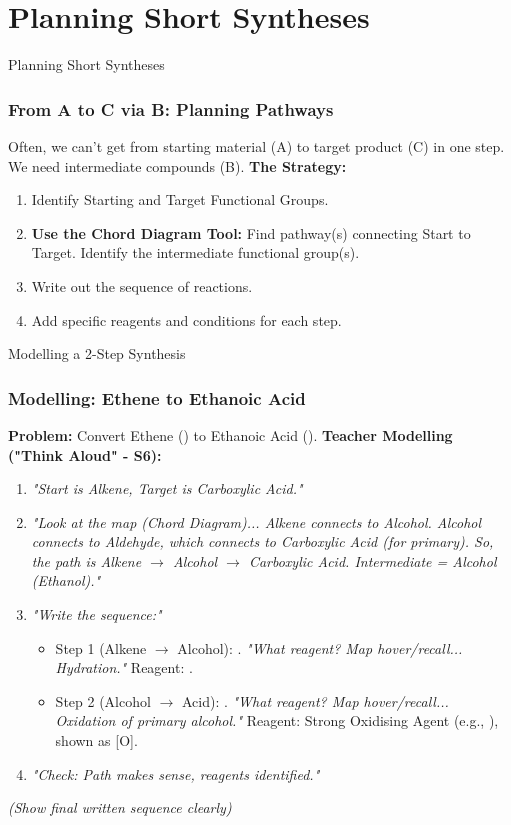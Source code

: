 \documentclass[xcolor=svgnames]{beamer}
\begin{document}
\section{Planning Short Syntheses}
\begin{frame}{Planning Short Syntheses}
    \frametitle{From A to C via B: Planning Pathways}
    Often, we can't get from starting material (A) to target product (C) in one step. We need intermediate compounds (B).
    \vspace{1em}
    \textbf{The Strategy:}
    \begin{enumerate}
        \item Identify Starting and Target Functional Groups.
        \item \textbf{Use the Chord Diagram Tool:} Find pathway(s) connecting Start to Target. Identify the intermediate functional group(s).
        \item Write out the sequence of reactions.
        \item Add specific reagents and conditions for each step.
    \end{enumerate}
\end{frame}

\begin{frame}{Modelling a 2-Step Synthesis}
    \frametitle{Modelling: Ethene to Ethanoic Acid}
    \textbf{Problem:} Convert Ethene () to Ethanoic Acid ().
    \vspace{1em}
    \textbf{Teacher Modelling ("Think Aloud" - S6):}
    \begin{enumerate}
        \item \textit{"Start is Alkene, Target is Carboxylic Acid."}
        \item \textit{"Look at the map (Chord Diagram)... Alkene connects to Alcohol. Alcohol connects to Aldehyde, which connects to Carboxylic Acid (for primary). So, the path is Alkene $\rightarrow$ Alcohol $\rightarrow$ Carboxylic Acid. Intermediate = Alcohol (Ethanol)."}
        \item \textit{"Write the sequence:"}
            \begin{itemize}
                \item Step 1 (Alkene $\rightarrow$ Alcohol): . \textit{"What reagent? Map hover/recall... Hydration."} Reagent: .
                \item Step 2 (Alcohol $\rightarrow$ Acid): . \textit{"What reagent? Map hover/recall... Oxidation of primary alcohol."} Reagent: Strong Oxidising Agent (e.g., ), shown as [O].
            \end{itemize}
        \item \textit{"Check: Path makes sense, reagents identified."}
    \end{enumerate}
    \vspace{1em}
    \textit{(Show final written sequence clearly)}
\end{frame}
\end{document}
